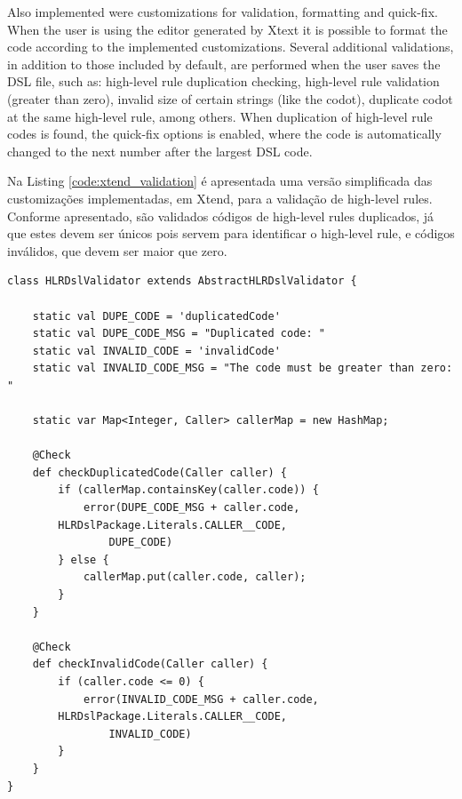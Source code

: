 
Also implemented were customizations for validation, formatting and quick-fix. When the user is using the editor generated by Xtext it is possible to format the code according to the implemented customizations. Several additional validations, in addition to those included by default, are performed when the user saves the DSL file, such as: high-level rule duplication checking, high-level rule validation (greater than zero), invalid size of certain strings (like the codot), duplicate codot at the same high-level rule, among others. When duplication of high-level rule codes is found, the quick-fix options is enabled, where the code is automatically changed to the next number after the largest DSL code.


Na Listing \ref{code:xtend_validation} é apresentada uma versão simplificada das customizações implementadas, em Xtend, para a validação de high-level rules. %
Conforme apresentado, são validados códigos de high-level rules duplicados, já que estes devem ser únicos pois servem para identificar o high-level rule, e códigos inválidos, que devem ser maior que zero.


\begin{small}
\begin{lstlisting}[frame=single, language=Xtend, caption={\it Validation Customization}, label={code:xtend_validation}]
class HLRDslValidator extends AbstractHLRDslValidator {

	static val DUPE_CODE = 'duplicatedCode'
	static val DUPE_CODE_MSG = "Duplicated code: "
	static val INVALID_CODE = 'invalidCode'
	static val INVALID_CODE_MSG = "The code must be greater than zero: "

	static var Map<Integer, Caller> callerMap = new HashMap;

	@Check
	def checkDuplicatedCode(Caller caller) {
		if (callerMap.containsKey(caller.code)) {
			error(DUPE_CODE_MSG + caller.code, 
        HLRDslPackage.Literals.CALLER__CODE,
				DUPE_CODE)
		} else {
			callerMap.put(caller.code, caller);
		}
	}

	@Check
	def checkInvalidCode(Caller caller) {
		if (caller.code <= 0) {
			error(INVALID_CODE_MSG + caller.code, 
        HLRDslPackage.Literals.CALLER__CODE,
				INVALID_CODE)
		}
	}
}	
\end{lstlisting}
\end{small}



